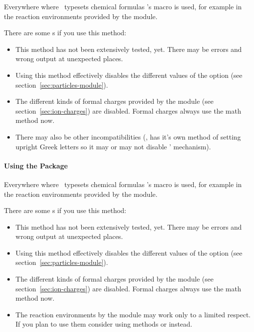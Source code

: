 \documentclass{chemmacros-manual}
\def\chemmodule*#1{\textquotedblleft#1\textquotedblright}%
\begin{document}
Everywhere where \chemmacros\ typesets chemical formulas 's macro
 is used, for example in the reaction environments provided by the
 module.

There are some s if you use this method:
\begin{itemize}
  \item This method has not been extensively tested, yet.  There may be errors
     and wrong output at unexpected places.
  \item Using this method effectively disables the different values of the
     option  (see
    section~\ref{sec:particles-module}).
  \item The different kinds of formal charges provided by the
     module (see section~\ref{sec:ion-charges}) are
    disabled.  Formal charges always use the math method now.
  \item There may also be other incompatibilities (\eg,  has it's
    own method of setting upright Greek letters so it may or may not disable
    \chemmacros' mechanism).
\end{itemize}

\paragraph{Using the  Package}\label{sec:using-chemfig}
Everywhere where \chemmacros\ typesets chemical formulas 's macro
 is used, for example in the reaction environments provided by
the  module.

There are some s if you use this method:
\begin{itemize}
  \item This method has not been extensively tested, yet.  There may be errors
     and wrong output at unexpected places.
  \item Using this method effectively disables the different values of the
     option  (see
    section~\ref{sec:particles-module}).
  \item The different kinds of formal charges provided by the
     module (see section~\ref{sec:ion-charges}) are
    disabled.  Formal charges always use the math method now.
  \item The reaction environments by the  module may
    work only to a limited respect.  If you plan to use them consider using
    methods  or  instead.
\end{itemize}
\end{document}
